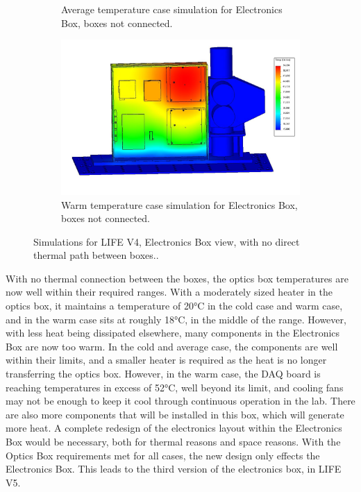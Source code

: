 \begin{figure}
\begin{subfigure}[h]{0.53\textwidth}
        \caption{Average temperature case simulation for Electronics Box, boxes not connected.}
        \label{fig:LIFE_V4_TA_Ebox_2b}
    \end{subfigure}
    \begin{subfigure}[h]{0.53\textwidth}
        \centering
        \includegraphics[width=\textwidth]{chap3_images/LIFE_V4_images/TA_Full_Model_Iter_12_ebox.JPG}
        \caption{Warm temperature case simulation for Electronics Box, boxes not connected.}
        \label{fig:LIFE_V4_TA_Ebox_2c}
    \end{subfigure}
    \caption{Simulations for LIFE V4, Electronics Box view, with no direct thermal path between boxes..}
    \label{LIFE_V4_TA_2_Ebox}
\end{figure}

With no thermal connection between the boxes, the optics box temperatures are now well within their required ranges. With a moderately sized heater in the optics box, it maintains a temperature of 20°C in the cold case and warm case, and in the warm case sits at roughly 18°C, in the middle of the range. However, with less heat being dissipated elsewhere, many components in the Electronics Box are now too warm. In the cold and average case, the components are well within their limits, and a smaller heater is required as the heat is no longer transferring the optics box. However, in the warm case, the DAQ board is reaching temperatures in excess of 52°C, well beyond its limit, and cooling fans may not be enough to keep it cool through continuous operation in the lab. There are also more components that will be installed in this box, which will generate more heat. A complete redesign of the electronics layout within the Electronics Box would be necessary, both for thermal reasons and space reasons. With the Optics Box requirements met for all cases, the new design only effects the Electronics Box. This leads to the third version of the electronics box, in LIFE V5.

